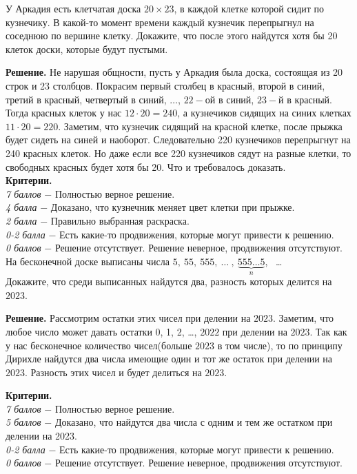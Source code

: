 У Аркадия есть клетчатая доска $20\times23$, в каждой клетке которой сидит по кузнечику. В какой-то момент времени каждый кузнечик перепрыгнул на соседнюю по вершине клетку. Докажите, что после этого найдутся хотя бы 20 клеток доски, которые будут пустыми. \par
\textbf{Решение.} Не нарушая общности, пусть у Аркадия была доска, состоящая из 20 строк и 23 столбцов. Покрасим первый столбец в красный, второй в синий, третий в красный, четвертый в синий, $\dotsc$, $22-$ой в синий, $23-$й в красный. Тогда красных клеток у нас $12\cdot20 = 240$, а кузнечиков сидящих на синих клетках $11\cdot20 = 220$. Заметим, что кузнечик сидящий на красной клетке, после прыжка будет сидеть на синей и наоборот. Следовательно 220 кузнечиков перепрыгнут на 240 красных клеток. Но даже если все 220 кузнечиков сядут на разные клетки, то свободных красных будет хотя бы 20. Что и требовалось доказать. \\

\textbf{Критерии.} \\
\textit{7 баллов} $-$ Полностью верное решение.\\ 
\textit{4 балла} $-$ Доказано, что кузнечник меняет цвет клетки при прыжке.\\ 
\textit{2 балла} $-$ Правильно выбранная раскраска.\\
\textit{0-2 балла} $-$ Есть какие-то продвижения, которые могут привести к решению.\\
\textit{0 баллов} $-$ Решение отсутствует. Решение неверное, продвижения отсутствуют. \\ 


 На бесконечной доске выписаны числа $5, \ 55, \ 555, \ \dots  \ , \ \underbrace{555\dots 5}_{n}$, \ \dots \\
Докажите, что среди выписанных найдутся два, разность которых делится на $2023$. 
\par
\textbf{Решение.} Рассмотрим остатки этих чисел при делении на $2023$. Заметим, что любое число может давать остатки 0, 1, 2, \dots , $2022$ при делении на $2023$. Так как у нас бесконечное количество чисел(больше $2023$ в том числе), то по принципу Дирихле найдутся два числа имеющие один и тот же остаток при делении на $2023$. Разность этих чисел и будет делиться на $2023$.

\textbf{Критерии.} \\
\textit{7 баллов} $-$ Полностью верное решение. \\
\textit{5 баллов} $-$ Доказано, что найдутся два числа с одним и тем же остатком при делении на 2023.\\
\textit{0-2 балла} $-$ Есть какие-то продвижения, которые могут привести к решению. \\ 
\textit{0 баллов} $-$ Решение отсутствует. Решение неверное, продвижения отсутствуют. \\ 